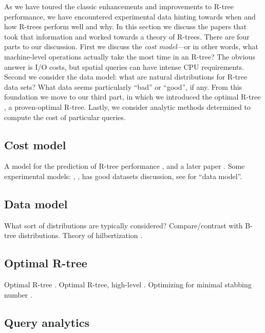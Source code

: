 As we have toured the classic enhancements and improvements to R-tree performance, we have encountered experimental data hinting towards when and how R-trees perform well and why.
In this section we discuss the papers that took that information and worked towards a theory of R-trees.
There are four parts to our discussion.
First we discuss the \emph{cost model}---or in other words, what machine-level operations actually take the most time in an R-tree?
The obvious answer is I/O costs, but spatial queries can have intense CPU requirements.
Second we consider the data model: what are natural distributions for R-tree data sets?
What data seems particularly ``bad'' or ``good'', if any.
From this foundation we move to our third part, in which we introduced the optimal R-tree \cite{argeberghaverkortyi04}, a proven-optimal R-tree.
Lastly, we consider analytic methods determined to compute the cost of particular queries.

\subsection{Cost model}
A model for the prediction of R-tree performance \cite{theodoridissellis96}, and a later paper \cite{theodoridisstefanakissellis00}.
Some experimental models: \cite{aboulnaganaughton00}, \cite{anyangsivasubramaniam01}, \cite{achakeevseeger12,achakeevseeger12a} has good datasets discussion, see for ``data model''.

\subsection{Data model}
What sort of distributions are typically considered?
Compare/contrast with B-tree distributions.
Theory of hilbertization \cite{haverkortwalderveen11}.

\subsection{Optimal R-tree}
Optimal R-tree \cite{argeberghaverkortyi04}.
Optimal R-tree, high-level \cite{yi12}.
Optimizing for minimal stabbing number \cite{bergkhosraviverdonschotweele11}.

\subsection{Query analytics}

